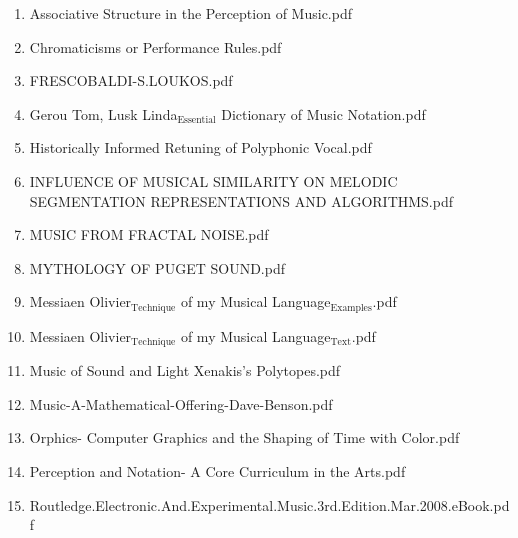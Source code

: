 \documentclass[11pt]{article}
\begin{document}
\begin{enumerate}
\item Associative Structure in the Perception of Music.pdf
\label{sec-1-1-1-1-11-19-27-16}

\item Chromaticisms or Performance Rules.pdf
\label{sec-1-1-1-1-11-19-27-17}

\item FRESCOBALDI-S.LOUKOS.pdf
\label{sec-1-1-1-1-11-19-27-18}

\item Gerou Tom, Lusk Linda$_{\text{Essential}}$ Dictionary of Music Notation.pdf
\label{sec-1-1-1-1-11-19-27-19}

\item Historically Informed Retuning of Polyphonic Vocal.pdf
\label{sec-1-1-1-1-11-19-27-20}

\item INFLUENCE OF MUSICAL SIMILARITY ON MELODIC SEGMENTATION REPRESENTATIONS AND ALGORITHMS.pdf
\label{sec-1-1-1-1-11-19-27-21}

\item MUSIC FROM FRACTAL NOISE.pdf
\label{sec-1-1-1-1-11-19-27-22}

\item MYTHOLOGY OF PUGET SOUND.pdf
\label{sec-1-1-1-1-11-19-27-23}

\item Messiaen Olivier$_{\text{Technique}}$ of my Musical Language$_{\text{Examples}}$.pdf
\label{sec-1-1-1-1-11-19-27-24}

\item Messiaen Olivier$_{\text{Technique}}$ of my Musical Language$_{\text{Text}}$.pdf
\label{sec-1-1-1-1-11-19-27-25}

\item Music of Sound and Light Xenakis's Polytopes.pdf
\label{sec-1-1-1-1-11-19-27-26}

\item Music-A-Mathematical-Offering-Dave-Benson.pdf
\label{sec-1-1-1-1-11-19-27-27}

\item Orphics- Computer Graphics and the Shaping of Time with Color.pdf
\label{sec-1-1-1-1-11-19-27-28}

\item Perception and Notation- A Core Curriculum in the Arts.pdf
\label{sec-1-1-1-1-11-19-27-29}

\item Routledge.Electronic.And.Experimental.Music.3rd.Edition.Mar.2008.eBook.pdf
\label{sec-1-1-1-1-11-19-27-30}


\end{enumerate}
\end{document}
